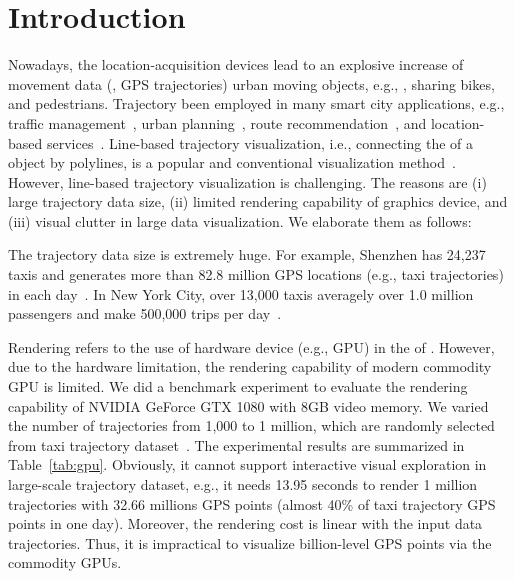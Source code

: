 \section{Introduction}\label{sec:intro}
Nowadays, the  location-acquisition devices lead to an explosive increase of movement data (, GPS trajectories)  urban moving objects, e.g., , sharing bikes, and pedestrians.
Trajectory  been employed in many smart city applications, e.g.,  traffic management~\cite{wang2014visual}, urban planning~\cite{tang2017efficient}, route recommendation~\cite{zheng2011learning}, and location-based services~\cite{liu2016smartadp, zheng2010collaborative}.
Line-based trajectory visualization, i.e., connecting the  of a  object by polylines, is a popular and conventional visualization method~\cite{chen2015survey}.
However,  line-based trajectory visualization is challenging.
The reasons are (i) large trajectory data size, (ii) limited rendering capability of graphics device, and (iii) visual clutter in large data visualization.
We elaborate them as follows:

 The trajectory data size is extremely huge.
For example, Shenzhen has 24,237 taxis and generates more than 82.8 million GPS locations (e.g., taxi trajectories) in each day~\cite{sz}. %
In New York City,  over 13,000 taxis  averagely  over 1.0 million passengers and make 500,000 trips per day~\cite{ferreira2013visual}.

Rendering refers to the use of hardware device (e.g., GPU) in the  of .
However, due to the hardware limitation, the rendering capability of modern commodity GPU is limited.
We did a benchmark experiment to evaluate the rendering capability of NVIDIA GeForce GTX 1080 with 8GB video memory.
We varied the number of trajectories from 1,000 to 1 million, which are randomly selected from \pt{} taxi trajectory dataset~\cite{pt}.%
 The experimental results are summarized in Table~\ref{tab:gpu}.
Obviously, it cannot support interactive visual exploration in large-scale trajectory dataset, e.g.,
it needs 13.95 seconds to render 1 million trajectories with 32.66 millions GPS points (almost 40\% of \sz{} taxi trajectory GPS points in one day).
Moreover, the rendering cost is linear with the input data trajectories.
Thus, it is impractical to visualize billion-level GPS points via the commodity GPUs.

